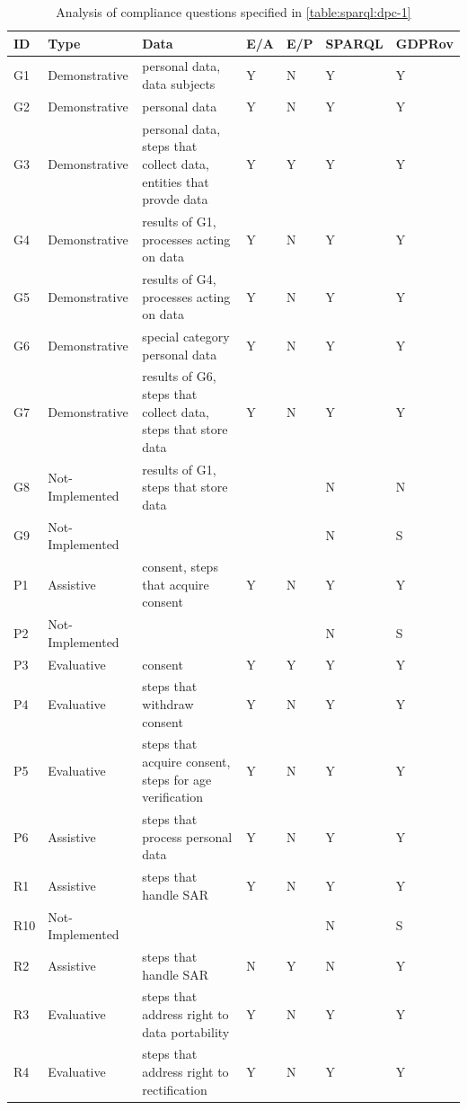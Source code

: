 \begin{table}[htbp]
\footnotesize
\centering
\caption{Analysis of compliance questions specified in \autoref{table:sparql:dpc-1}}
\begin{tabularx}{\textwidth}{|l|l|X|l|l|l|l|}
\hline
ID & Type & Data & E/A & E/P & SPARQL & GDPRov \\ \hline
G1 & Demonstrative & personal data, data subjects & Y & N & Y & Y \\ \hline
G2 & Demonstrative & personal data & Y & N & Y & Y \\ \hline
G3 & Demonstrative & personal data, steps that collect data, entities that provde data & Y & Y & Y & Y \\ \hline
G4 & Demonstrative & results of G1, processes acting on data & Y & N & Y & Y \\ \hline
G5 & Demonstrative & results of G4, processes acting on data & Y & N & Y & Y \\ \hline
G6 & Demonstrative & special category personal data & Y & N & Y & Y \\ \hline
G7 & Demonstrative & results of G6, steps that collect data, steps that store data & Y & N & Y & Y \\ \hline
G8 & Not-Implemented & results of G1, steps that store data &  &  & N & N \\ \hline
G9 & Not-Implemented &  &  &  & N & S \\ \hline
P1 & Assistive & consent, steps that acquire consent & Y & N & Y & Y \\ \hline
P2 & Not-Implemented &  &  &  & N & S \\ \hline
P3 & Evaluative & consent & Y & Y & Y & Y \\ \hline
P4 & Evaluative & steps that withdraw consent & Y & N & Y & Y \\ \hline
P5 & Evaluative & steps that acquire consent, steps for age verification & Y & N & Y & Y \\ \hline
P6 & Assistive & steps that process personal data & Y & N & Y & Y \\ \hline
R1 & Assistive & steps that handle SAR & Y & N & Y & Y \\ \hline
R10 & Not-Implemented &  &  &  & N & S \\ \hline
R2 & Assistive & steps that handle SAR & N & Y & N & Y \\ \hline
R3 & Evaluative & steps that address right to data portability & Y & N & Y & Y \\ \hline
R4 & Evaluative & steps that address right to rectification & Y & N & Y & Y \\ \hline

\end{tabularx}
\end{table}
